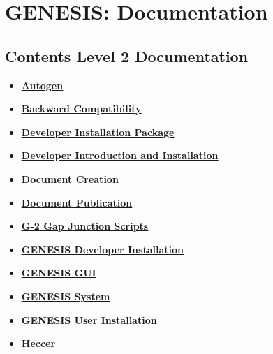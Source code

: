 \documentclass[12pt]{article}
\begin{document}
\section*{GENESIS: Documentation}

\subsection*{Contents Level 2 Documentation}

\begin{itemize}

\item \href{../autogen/autogen.pdf}{\bf \underline{Autogen}}

\item \href{../backward-compatibility/backward-compatibility.pdf}{\bf \underline{Backward Compatibility}}

\item \href{../installer-package/installer-package.pdf}{\bf \underline{Developer Installation Package}}

\item \href{../developers-intro/developers-intro.pdf}{\bf \underline{Developer Introduction and Installation}}

\item \href{../document-create/document-create.pdf}{\bf \underline{Document Creation}}

\item \href{../publication/publication.pdf}{\bf \underline{Document Publication}}

\item \href{../g2-gap-junction/g2-gap-junction.pdf}{\bf \underline{G-2 Gap Junction Scripts}}

\item \href{../installation-developer/installation-developer.pdf}{\bf \underline{GENESIS Developer Installation}}

\item \href{../gui/gui.pdf}{\bf \underline{GENESIS GUI}}

\item \href{../genesis-system/genesis-system.pdf}{\bf \underline{GENESIS System}}

\item \href{../installation-user/installation-user.pdf}{\bf \underline{GENESIS User Installation}}

\item \href{../heccer/heccer.pdf}{\bf \underline{Heccer}}


\end{itemize}
\end{document}
